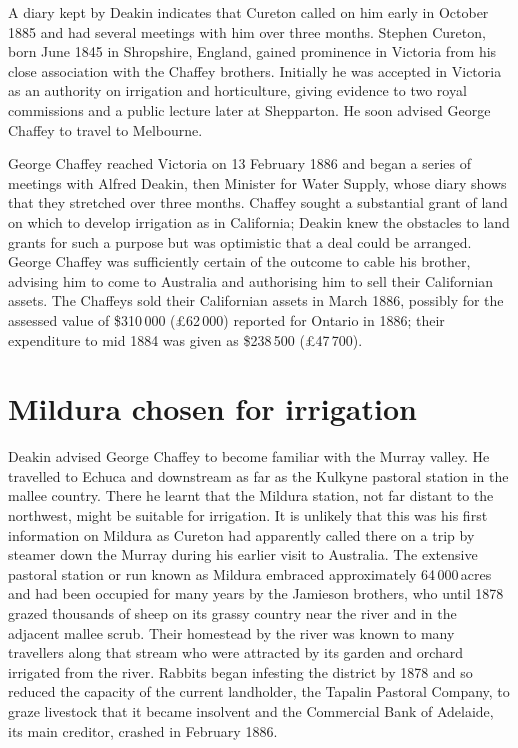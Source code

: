A diary kept by Deakin indicates that Cureton called on him early in
October 1885 and had several meetings with him over three months.
Stephen Cureton, born June 1845 in Shropshire, England, gained
prominence in Victoria from his close association with the Chaffey
brothers.  Initially he was accepted in Victoria as an authority on
irrigation and horticulture, giving evidence to two royal commissions
and a public lecture later at Shepparton.  He soon advised George
Chaffey to travel to Melbourne.

George Chaffey reached Victoria on 13 February 1886 and began a series
of meetings with Alfred Deakin,  then Minister for
Water Supply, whose diary shows that they stretched over three
months. Chaffey sought a substantial grant of land on which to develop
irrigation as in California; Deakin knew the obstacles to land grants
for such a purpose but was optimistic that a deal could be arranged.
George Chaffey was sufficiently certain of the outcome to cable his
brother, advising him to come to Australia and authorising him to sell
their Californian assets.  The Chaffeys sold their Californian assets
in March 1886, possibly for the assessed value of \$310\,000
(\pounds62\,000) reported for Ontario in 1886; their expenditure to
mid 1884 was given as \$238\,500
(\pounds47\,700).

\section*{Mildura chosen for irrigation}

Deakin advised George Chaffey to become familiar with the Murray
valley.  He travelled to Echuca  and downstream as far as the Kulkyne pastoral station in the
mallee country.  There he learnt that the Mildura station, not far
distant to the northwest, might be suitable for irrigation.  It is
unlikely that this was his first information on Mildura as Cureton had
apparently called there on a trip by steamer down the Murray during
his earlier visit to Australia.  The extensive pastoral station or run
known as Mildura embraced approximately 64\,000\,acres and had been
occupied for many years by the Jamieson brothers, 
who until 1878 grazed thousands of sheep on its grassy country near
the river and in the adjacent mallee scrub.  Their homestead by the
river was known to many travellers along that stream who were
attracted by its garden and orchard irrigated from the river.  Rabbits
began infesting the district by 1878 and so reduced the capacity of
the current landholder, the Tapalin Pastoral Company, to graze
livestock that it became insolvent and the Commercial Bank of
Adelaide,
 its main
creditor, crashed in February
1886.

